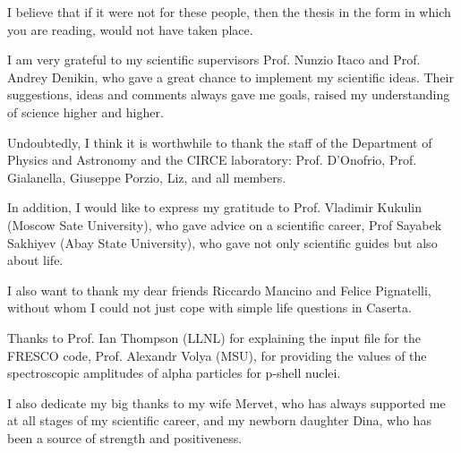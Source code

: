 \documentclass[
12pt, %
oneside, %
english, %
onehalfspacing, %
onehalfspacing, %
headsepline, %
]{MastersDoctoralThesis} %
\begin{document}

\begin{acknowledgements}
\addchaptertocentry{\acknowledgementname} %
I believe that if it were not for these people, then the thesis in the form in which you are reading, would not have taken place.

I am very grateful to my scientific supervisors Prof. Nunzio Itaco and Prof. Andrey Denikin, who gave a great chance to implement my scientific ideas. Their suggestions, ideas and comments always gave me goals, raised my understanding of science higher and higher.

Undoubtedly, I think it is worthwhile to thank the staff of the Department of Physics and Astronomy and the CIRCE laboratory: Prof. D'Onofrio, Prof. Gialanella, Giuseppe Porzio, Liz, and all members.

In addition, I would like to express my gratitude to Prof. Vladimir Kukulin (Moscow Sate University), who gave advice on a scientific career, Prof Sayabek Sakhiyev (Abay State University), who gave not only scientific guides but also about life.

I also want to thank my dear friends Riccardo Mancino and Felice Pignatelli, without whom I could not just cope with simple life questions in Caserta.

Thanks to Prof. Ian Thompson (LLNL) for explaining the input file for the FRESCO code, Prof. Alexandr Volya (MSU), for providing the values of the spectroscopic amplitudes of alpha particles for p-shell nuclei.

I also dedicate my big thanks to my wife Mervet, who has always supported me at all stages of my scientific career, and my newborn daughter Dina, who has been a source of strength and positiveness.
\end{acknowledgements}


\tableofcontents %

\listoffigures %

\listoftables %
\end{document}
